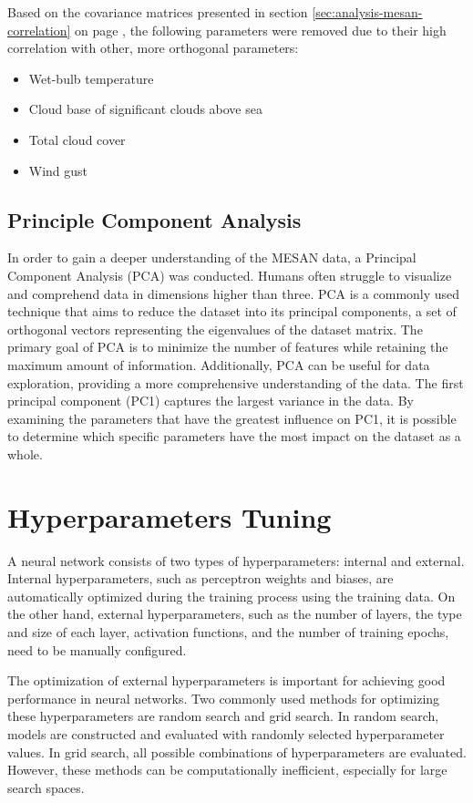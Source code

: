 Based on the covariance matrices presented in section \ref{sec:analysis-mesan-correlation} on page \pageref{sec:analysis-mesan-correlation}, the following parameters were removed due to their high correlation with other, more orthogonal parameters:

\begin{itemize}
	\item Wet-bulb temperature
	\item Cloud base of significant clouds above sea
	\item Total cloud cover
	\item Wind gust
\end{itemize}

\subsection{Principle Component Analysis}

In order to gain a deeper understanding of the MESAN data, a Principal Component Analysis (PCA) was conducted. Humans often struggle to visualize and comprehend data in dimensions higher than three. PCA is a commonly used technique that aims to reduce the dataset into its principal components, a set of orthogonal vectors representing the eigenvalues of the dataset matrix. The primary goal of PCA is to minimize the number of features while retaining the maximum amount of information. Additionally, PCA can be useful for data exploration, providing a more comprehensive understanding of the data. The first principal component (PC1) captures the largest variance in the data. By examining the parameters that have the greatest influence on PC1, it is possible to determine which specific parameters have the most impact on the dataset as a whole.

\section{Hyperparameters Tuning}
\label{sec:method-hypertuning}

A neural network consists of two types of hyperparameters: internal and external. Internal hyperparameters, such as perceptron weights and biases, are automatically optimized during the training process using the training data. On the other hand, external hyperparameters, such as the number of layers, the type and size of each layer, activation functions, and the number of training epochs, need to be manually configured.

The optimization of external hyperparameters is important for achieving good performance in neural networks. Two commonly used methods for optimizing these hyperparameters are random search and grid search. In random search, models are constructed and evaluated with randomly selected hyperparameter values. In grid search, all possible combinations of hyperparameters are evaluated. However, these methods can be computationally inefficient, especially for large search spaces.

